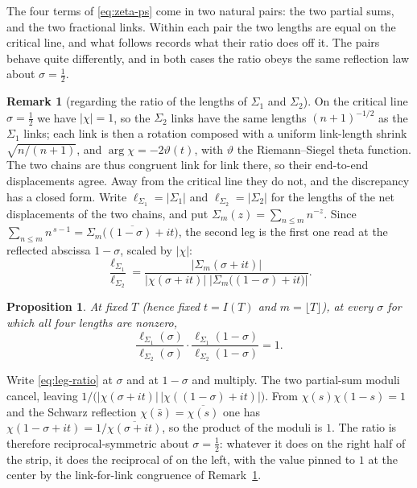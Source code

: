 \documentclass[11pt]{article}
\newtheorem{proposition}[theorem]{Proposition}
\theoremstyle{definition}
\newtheorem{remark}[theorem]{Remark}
\begin{document}
The four terms of \eqref{eq:zeta-ps} come in two natural pairs: the two
partial sums, and the two fractional links. Within each pair the two lengths
are equal on the critical line, and what follows records what their
ratio does off it. The pairs behave quite differently, and in both cases the
ratio obeys the same reflection law about $\sigma=\tfrac12$.

\begin{remark}[regarding the ratio of the lengths of $\Sigma_1$ and $\Sigma_2$]\label{rem:leg-ratio}
On the critical line $\sigma=\tfrac12$ we have $|\chi|=1$, so the $\Sigma_2$ links
have the same lengths $(n+1)^{-1/2}$ as the $\Sigma_1$ links; each link is then a
rotation composed with a uniform link-length shrink $\sqrt{n/(n+1)}$, and
$\arg\chi=-2\vartheta(t)$, with $\vartheta$ the Riemann--Siegel theta function.
The two chains are thus congruent link for link there, so their end-to-end
displacements agree. Away from the critical line they do not, and the discrepancy has a
closed form. Write $\ell_{\Sigma_1}=|\Sigma_1|$ and $\ell_{\Sigma_2}=|\Sigma_2|$
for the lengths of the net displacements of the two chains,
and put $\Sigma_m(z)=\sum_{n\le m}n^{-z}$. Since
$\sum_{n\le m}n^{\,s-1}=\overline{\Sigma_m\bigl((1-\sigma)+it\bigr)}$, the
second leg is the first one read at the reflected abscissa $1-\sigma$, scaled
by $|\chi|$:
\begin{equation}\label{eq:leg-ratio}
\frac{\ell_{\Sigma_1}}{\ell_{\Sigma_2}}
=
\frac{\bigl|\Sigma_m(\sigma+it)\bigr|}
     {\bigl|\chi(\sigma+it)\bigr|\;
      \bigl|\Sigma_m\bigl((1-\sigma)+it\bigr)\bigr|}.
\end{equation}
\end{remark}

\begin{proposition}\label{prop:leg-ratio-reflection}
At fixed $T$ (hence fixed $t=I(T)$ and $m=\lfloor T\rfloor$), at every
$\sigma$ for which all four lengths are nonzero,
\begin{equation}\label{eq:leg-ratio-symmetry}
\frac{\ell_{\Sigma_1}(\sigma)}{\ell_{\Sigma_2}(\sigma)}
\cdot
\frac{\ell_{\Sigma_1}(1-\sigma)}{\ell_{\Sigma_2}(1-\sigma)}
=
1.
\end{equation}
\end{proposition}

Write \eqref{eq:leg-ratio} at $\sigma$ and at $1-\sigma$ and multiply.
The two partial-sum moduli cancel, leaving
$1\big/\bigl(\lvert\chi(\sigma+it)\rvert\,
\lvert\chi((1-\sigma)+it)\rvert\bigr)$.
From $\chi(s)\chi(1-s)=1$ and the Schwarz reflection
$\chi(\bar s)=\overline{\chi(s)}$ one has
$\chi(1-\sigma+it)=1/\overline{\chi(\sigma+it)}$,
so the product of the moduli is $1$.
The ratio is therefore reciprocal-symmetric about $\sigma=\tfrac12$: whatever
it does on the right half of the strip, it does the reciprocal of on the left,
with the value pinned to $1$ at the center by the link-for-link congruence
of Remark~\ref{rem:leg-ratio}.
\end{document}
